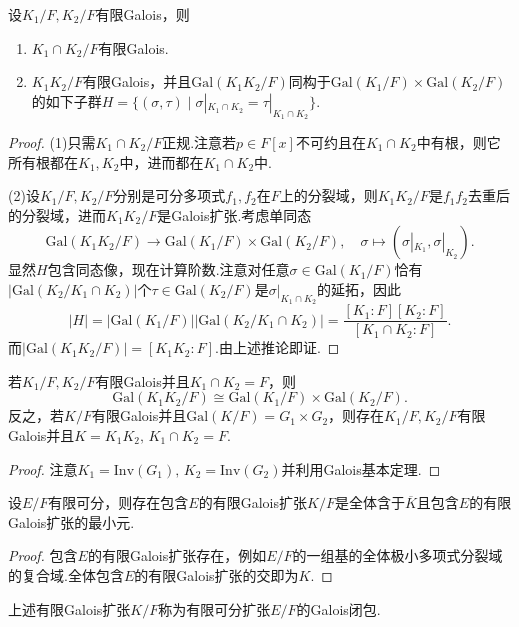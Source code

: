 \begin{prop}
    设$K_1/F,K_2/F$有限Galois，则
    \begin{enumerate}
        \item $K_1\cap K_2/F$有限Galois.
        \item $K_1K_2/F$有限Galois，并且$\mathrm{Gal}(K_1K_2/F)$同构于$\mathrm{Gal}(K_1/F)\times\mathrm{Gal}(K_2/F)$的如下子群$H=\{(\sigma,\tau)\mid\sigma|_{K_1\cap K_2}=\tau|_{K_1\cap K_2}\}$.
    \end{enumerate}
\end{prop}
\begin{proof}
    \hspace*{5.2pt}(1)只需$K_1\cap K_2/F$正规.注意若$p\in F[x]$不可约且在$K_1\cap K_2$中有根，则它所有根都在$K_1,K_2$中，进而都在$K_1\cap K_2$中.

    (2)设$K_1/F,K_2/F$分别是可分多项式$f_1,f_2$在$F$上的分裂域，则$K_1K_2/F$是$f_1f_2$去重后的分裂域，进而$K_1K_2/F$是Galois扩张.考虑单同态
    \[
        \mathrm{Gal}(K_1K_2/F)\to\mathrm{Gal}(K_1/F)\times\mathrm{Gal}(K_2/F),\quad\sigma\mapsto(\sigma|_{K_1},\sigma|_{K_2}).
    \]
    显然$H$包含同态像，现在计算阶数.注意对任意$\sigma\in\mathrm{Gal}(K_1/F)$恰有$|\mathrm{Gal}(K_2/K_1\cap K_2)|$个$\tau\in\mathrm{Gal}(K_2/F)$是$\sigma|_{K_1\cap K_2}$的延拓，因此
    \[
        |H|=|\mathrm{Gal}(K_1/F)||\mathrm{Gal}(K_2/K_1\cap K_2)|=\frac{[K_1:F][K_2:F]}{[K_1\cap K_2:F]}.
    \]
    而$|\mathrm{Gal}(K_1K_2/F)|=[K_1K_2:F]$.由上述推论即证.
\end{proof}
\begin{cor*}
    若$K_1/F,K_2/F$有限Galois并且$K_1\cap K_2=F$，则
    \[
        \mathrm{Gal}(K_1K_2/F)\cong\mathrm{Gal}(K_1/F)\times\mathrm{Gal}(K_2/F).
    \]
    反之，若$K/F$有限Galois并且$\mathrm{Gal}(K/F)=G_1\times G_2$，则存在$K_1/F,K_2/F$有限Galois并且$K=K_1K_2,\,K_1\cap K_2=F$.
\end{cor*}
\begin{proof}
    注意$K_1=\mathrm{Inv}(G_1),\,K_2=\mathrm{Inv}(G_2)$并利用Galois基本定理.
\end{proof}
\begin{cor*}
    设$E/F$有限可分，则存在包含$E$的有限Galois扩张$K/F$是全体含于$\overline{K}$且包含$E$的有限Galois扩张的最小元.
\end{cor*}
\begin{proof}
    包含$E$的有限Galois扩张存在，例如$E/F$的一组基的全体极小多项式分裂域的复合域.全体包含$E$的有限Galois扩张的交即为$K$.
\end{proof}
\begin{remark}
    上述有限Galois扩张$K/F$称为有限可分扩张$E/F$的{\heiti Galois闭包}.
\end{remark}

